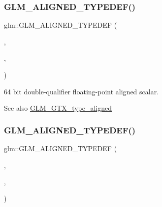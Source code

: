 \subsubsection{\texorpdfstring{G\+L\+M\+\_\+\+A\+L\+I\+G\+N\+E\+D\+\_\+\+T\+Y\+P\+E\+D\+E\+F()}{GLM\_ALIGNED\_TYPEDEF()}\hspace{0.1cm}{\footnotesize\ttfamily [141/209]}}
{\footnotesize\ttfamily glm\+::\+G\+L\+M\+\_\+\+A\+L\+I\+G\+N\+E\+D\+\_\+\+T\+Y\+P\+E\+D\+EF (\begin{DoxyParamCaption}\item[{\mbox{\hyperlink{group__gtc__type__precision_gade966a3eb25ebeb16dd53c40d3fdeb46}{float64\+\_\+t}}}]{,  }\item[{aligned\+\_\+float64\+\_\+t}]{,  }\item[{8}]{ }\end{DoxyParamCaption})}

64 bit double-\/qualifier floating-\/point aligned scalar. \begin{DoxySeeAlso}{See also}
\mbox{\hyperlink{group__gtx__type__aligned}{G\+L\+M\+\_\+\+G\+T\+X\+\_\+type\+\_\+aligned}} 
\end{DoxySeeAlso}
\mbox{\label{group__gtx__type__aligned_gaa4deaa0dea930c393d55e7a4352b0a20}} 
\subsubsection{\texorpdfstring{G\+L\+M\+\_\+\+A\+L\+I\+G\+N\+E\+D\+\_\+\+T\+Y\+P\+E\+D\+E\+F()}{GLM\_ALIGNED\_TYPEDEF()}\hspace{0.1cm}{\footnotesize\ttfamily [142/209]}}
{\footnotesize\ttfamily glm\+::\+G\+L\+M\+\_\+\+A\+L\+I\+G\+N\+E\+D\+\_\+\+T\+Y\+P\+E\+D\+EF (\begin{DoxyParamCaption}\item[{\mbox{\hyperlink{group__gtc__type__precision_gab721f828b41f46b20cf4883b50733d3b}{float64}}}]{,  }\item[{aligned\+\_\+f64}]{,  }\item[{8}]{ }\end{DoxyParamCaption})}


